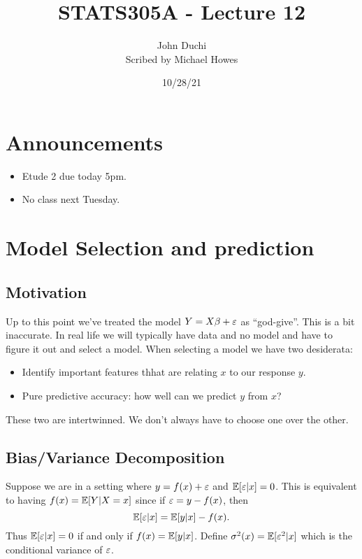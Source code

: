 




\title{STATS305A - Lecture 12}
\author{John Duchi\\ Scribed by Michael Howes}
\date{10/28/21}

\pagestyle{fancy}
\fancyhf{}


\maketitle
\tableofcontents
\section{Announcements}
\begin{itemize}
    \item Etude 2 due today 5pm.
    \item No class next Tuesday.
\end{itemize}
\section{Model Selection and prediction}
\subsection{Motivation}
Up to this point we've treated the model $Y=X\beta + \varepsilon$ as ``god-give''. This is a bit inaccurate. In real life we will typically have data and no model and have to figure it out and select a model. When selecting a model we have two desiderata:
\begin{itemize}
    \item Identify important features thhat are relating $x$ to our response $y$.
    \item Pure predictive accuracy: how well can we predict $y$ from $x$?
\end{itemize}
These two are intertwinned. We don't always have to choose one over the other.
\subsection{Bias/Variance Decomposition}
Suppose we are in a setting where $y = f(x)+\varepsilon$ and ${\mathbb{E}}[\varepsilon|x]=0$. This is equivalent to having $f(x) = {\mathbb{E}}[Y|X=x]$ since if $\varepsilon = y-f(x)$, then \[{\mathbb{E}}[\varepsilon|x] = {\mathbb{E}}[y|x] - f(x).\]
Thus ${\mathbb{E}}[\varepsilon|x]=0$ if and only if $f(x) = {\mathbb{E}}[y|x]$. Define $\sigma^2(x) = {\mathbb{E}}[\varepsilon^2|x]$ which is the conditional variance of $\varepsilon$. 

